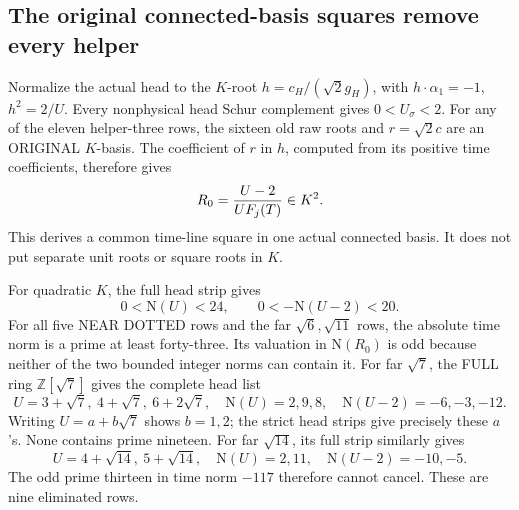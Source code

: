 \subsection{The original connected-basis squares remove every helper}
\label{app:arithB16helpersquares}

Normalize the actual head to the \(K\)-root
\(h=c_H/(\sqrt2g_H)\), with
\(h\cdot\alpha_1=-1\), \(h^2=2/U\).
Every nonphysical head Schur complement gives
\(0<U_\sigma<2\).
For any of the eleven helper-three rows, the
sixteen old raw roots and \(r=\sqrt2c\) are an
ORIGINAL \(K\)-basis.
The coefficient of \(r\) in \(h\), computed from
its positive time coefficients, therefore gives
\[
                      R_0={U-2\over U F_j(T)}\in K^2 .
\]
This derives a common time-line square in one
actual connected basis.  It does not put separate
unit roots or square roots in \(K\).

For quadratic \(K\), the full head strip gives
\[
                     0<\mathrm N(U)<24,\qquad
                     0<-\mathrm N(U-2)<20.
\]
For all five NEAR DOTTED rows and the far
\(\sqrt6,\sqrt{11}\) rows, the absolute time
norm is a prime at least forty-three.
Its valuation in \(\mathrm N(R_0)\) is odd
because neither of the two bounded integer norms
can contain it.
For far \(\sqrt7\), the FULL ring
\(\mathbb Z[\sqrt7]\) gives the complete head list
\[
 U=3+\sqrt7,\ 4+\sqrt7,\ 6+2\sqrt7,
\quad \mathrm N(U)=2,9,8,\quad
 \mathrm N(U-2)=-6,-3,-12 .
\]
Writing \(U=a+b\sqrt7\) shows \(b=1,2\);
the strict head strips give precisely these \(a\)'s.
None contains prime nineteen.
For far \(\sqrt{14}\), its full strip similarly
gives
\[
 U=4+\sqrt{14},\ 5+\sqrt{14},\quad
 \mathrm N(U)=2,11,\quad\mathrm N(U-2)=-10,-5 .
\]
The odd prime thirteen in time norm \(-117\)
therefore cannot cancel.
These are nine eliminated rows.

